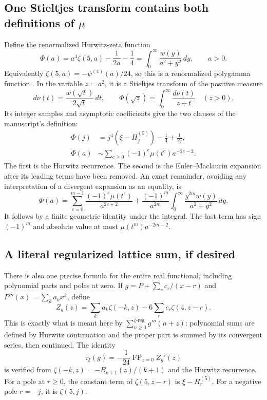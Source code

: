 \documentclass[11pt]{article}
\theoremstyle{definition}
\theoremstyle{remark}\newtheorem*{remark}{Remark}
\newcommand{\FP}{\operatorname{FP}}
\newcommand{\dd}{\,d}
\begin{document}
\subsection{One Stieltjes transform contains both definitions of \texorpdfstring{$\mu$}{mu}}
Define the renormalized Hurwitz-zeta function
\begin{equation}\label{eq:Phi}
 \Phi(a)=a^4\zeta(5,a)-\frac1{2a}-\frac14
       =\int_0^\infty\frac{w(y)}{a^2+y^2}\dd y,
 \qquad a>0.
\end{equation}
Equivalently $\zeta(5,a)=-\psi^{(4)}(a)/24$, so this is a renormalized
polygamma function \cite{Polygamma}. In the variable $z=a^2$, it is a Stieltjes
transform of the positive measure
\[
 d\nu(t)=\frac{w(\sqrt t)}{2\sqrt t}\dd t,\qquad
 \Phi(\sqrt z)=\int_0^\infty\frac{d\nu(t)}{z+t}\quad(z>0).
\]
Its integer samples and asymptotic coefficients give the two clauses of the
manuscript's definition:
\begin{align}
 \Phi(j)&=j^4(\xi-H_j^{(5)})-\frac14+\frac1{2j},\label{eq:samples}\\
 \Phi(a)&\sim\sum_{e\ge0}(-1)^e\mu(t^e)a^{-2e-2}.
 \label{eq:PhiAsymp}
\end{align}
The first is the Hurwitz recurrence. The second is the Euler--Maclaurin expansion
after its leading terms have been removed. An exact remainder, avoiding any
interpretation of a divergent expansion as an equality, is
\begin{equation}\label{eq:remainder}
 \Phi(a)=\sum_{e=0}^{m-1}\frac{(-1)^e\mu(t^e)}{a^{2e+2}}
 +\frac{(-1)^m}{a^{2m}}\int_0^\infty
       \frac{y^{2m}w(y)}{a^2+y^2}\dd y.
\end{equation}
It follows by a finite geometric identity under the integral. The last term has
sign $(-1)^m$ and absolute value at most $\mu(t^m)a^{-2m-2}$.

\subsection{A literal regularized lattice sum, if desired}
There is also one precise formula for the entire real functional, including
polynomial parts and poles at zero. If
$g=P+\sum_r c_r/(x-r)$ and $P'''(x)=\sum_k a_kx^k$, define
\[
 Z_g(z)=\sum_k a_k\zeta(-k,z)-6\sum_r c_r\zeta(4,z-r).
\]
This is exactly what is meant here by $\sum_{n\ge0}^{\zeta\text{-reg}}g'''(n+z)$:
polynomial sums are defined by Hurwitz continuation and the proper part is
summed by its convergent series, then continued. The identity
\begin{equation}\label{eq:regsum}
 \boxed{\displaystyle
 \tau_\xi(g)=-\frac1{24}\FP_{z=0} Z_g'(z)}
\end{equation}
is verified from $\zeta(-k,z)=-B_{k+1}(z)/(k+1)$ and the Hurwitz recurrence.
For a pole at $r\ge0$, the constant term of $\zeta(5,z-r)$ is
$\xi-H_r^{(5)}$. For a negative pole $r=-j$, it is $\zeta(5,j)$.
\end{document}

